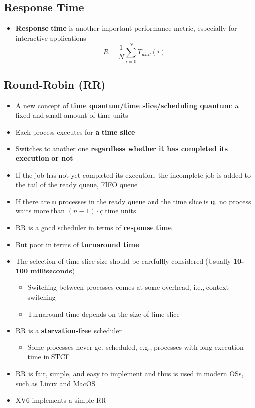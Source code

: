 \documentclass[a4paper,11pt,english]{article}
\begin{document}
\subsection*{Response Time}
\begin{itemize}
    \item \textbf{\color{blue} Response time} is another important performance metric, especially for interactive applications
        \[
            R = \frac{1}{N}\sum_{i=0}^{N}T_{wait}(i)
        \]
\end{itemize}

\subsection*{Round-Robin (RR)}
\begin{itemize}
    \item A new concept of \textbf{\color{blue} time quantum/time slice/scheduling quantum}: a fixed and small amount of time units
    \item Each process executes for \textbf{\color{blue} a time slice}
    \item Switches to another one \textbf{\color{red} regardless whether it has completed its execution or not}
    \item If the job has not yet completed its execution, the incomplete job is added to the tail of the ready queue, FIFO queue
    \item If there are \textbf{\color{blue} n} processes in the ready queue and the time slice is \textbf{\color{blue} q}, no process waits more than \textbf{\color{blue} $(n-1) \cdot q$} time units
    \item RR is a good scheduler in terms of \textbf{\color{blue} response time}
    \item But poor in terms of \textbf{\color{red} turnaround time}
    \item The selection of time slice size should be carefullly considered (Usually \textbf{\color{blue} 10-100 milliseconds})
        \begin{itemize}
            \item Switching between processes comes at some overhead, i.e., context switching
            \item Turnaround time depends on the size of time slice
        \end{itemize}
    \item RR is a \textbf{\color{blue} starvation-free} scheduler
        \begin{itemize}
            \item Some processes never get scheduled, e.g., processes with long execution time in STCF
        \end{itemize}
    \item RR is fair, simple, and easy to implement and thus is used in modern OSs, such as Linux and MacOS
    \item XV6 implements a simple RR
\end{itemize}
\end{document}
